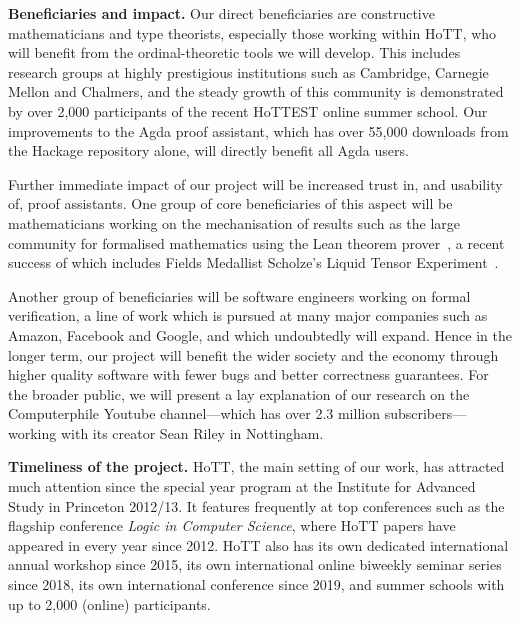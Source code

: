 \documentclass[a4paper,11pt]{article}
\let\oldcite\cite
\renewcommand*\cite[1]{{\protect\NoHyper\oldcite{#1}\protect\endNoHyper}}
\renewcommand{\paragraph}[1]{\textbf{#1.}}
\begin{document}
\paragraph{Beneficiaries and impact}
%
Our direct beneficiaries are constructive mathematicians and type theorists, especially those working within HoTT, who will benefit from the ordinal-theoretic tools we will develop.
%
This includes research groups at highly prestigious institutions such as Cambridge, Carnegie Mellon and Chalmers, and the steady growth of this community is demonstrated by over 2,000 participants of the recent HoTTEST online summer school.
%
Our improvements to the Agda proof assistant, which has over 55,000 downloads from the Hackage repository alone, will directly benefit all Agda users.


Further immediate impact of our project will be increased trust in, and usability of, proof assistants.
One group of core beneficiaries of this aspect will
be mathematicians working on the mechanisation of results such as the large community for formalised mathematics using the Lean theorem prover~\cite{mathlib2020}, a recent success of which includes Fields Medallist Scholze's Liquid Tensor Experiment~\cite{scholze:tensor}.

Another group of beneficiaries will be software engineers working on formal verification, a line of work which is pursued at many major companies such as Amazon, Facebook and Google, and which undoubtedly will expand. Hence in the longer term, our project will benefit the wider society and the economy through higher quality software with fewer bugs and better correctness guarantees.
For the %
broader public, we will present a lay explanation of our research on the Computerphile Youtube channel---which has over 2.3 million subscribers---working with its creator Sean Riley in Nottingham.



\paragraph{Timeliness of the project}
HoTT, the main setting of our work,
has attracted much attention since the special year program at the Institute for Advanced Study in Princeton 2012/13.
It features frequently at top conferences such as the flagship conference \emph{Logic in Computer Science}, where HoTT papers have appeared in every year since 2012.
HoTT also has its own dedicated international annual workshop since 2015, its own international online biweekly seminar series since 2018, its own international conference since 2019,
and summer schools with up to 2,000 (online) participants.
\end{document}
